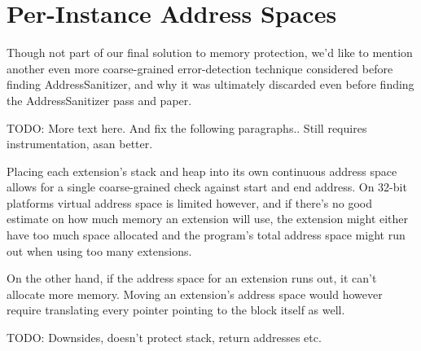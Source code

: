 \section {Per-Instance Address Spaces}

Though not part of our final solution to memory protection, we'd like to mention
another even more coarse-grained error-detection technique considered before
finding AddressSanitizer, and why it was ultimately discarded even before
finding the AddressSanitizer pass and paper.

TODO: More text here. And fix the following paragraphs.. Still requires
instrumentation, asan better.

Placing each extension's stack and heap into its own continuous address space
allows for a single coarse-grained check against start and end address. On
32-bit platforms virtual address space is limited however, and if there's no
good estimate on how much memory an extension will use, the extension might
either have too much space allocated and the program's total address space
might run out when using too many extensions.

On the other hand, if the address space for an extension runs out, it can't
allocate more memory. Moving an extension's address space would however require
translating every pointer pointing to the block itself as well.

TODO: Downsides, doesn't protect stack, return addresses etc.
